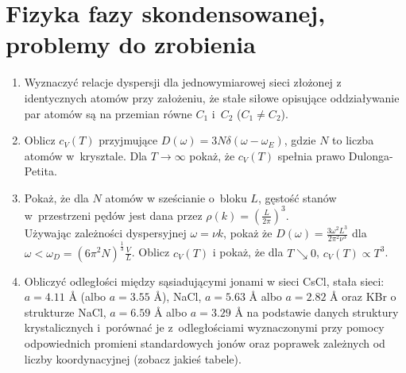 \documentclass[a4paper,11pt]{article}
\begin{document}










\section{Fizyka fazy skondensowanej, problemy do zrobienia}





\begin{enumerate}

\item Wyznaczyć relacje dyspersji dla jednowymiarowej sieci złożonej z
  identycznych atomów przy założeniu, że stałe siłowe opisujące
  oddziaływanie par atomów są na przemian równe $C_{ 1 }$ i~$C_{ 2 }$
  ($C_{ 1 } \neq C_{ 2 }$).

\item Oblicz $c_{ V }( T )$ przyjmujące
  $D( \omega ) = 3 N \delta( \omega - \omega_{ E } )$, gdzie $N$ to
  liczba atomów w~krysztale. Dla $T \to \infty$ pokaż, że
  $c_{ V }( T )$ spełnia prawo Dulonga-Petita.



\item Pokaż, że dla $N$ atomów w sześcianie o~bloku $L$, gęstość stanów
  w~przestrzeni pędów jest dana przez
  $\rho( k ) = \left( \frac{ L }{ 2\pi } \right)^{ 3 }$. \\
  Używając zależności dyspersyjnej $\omega = \nu k$, pokaż że
  $D( \omega ) = \frac{ 3 \omega^{ 2 } L^{ 3 } }{ 2\pi^{ 2 } \nu^{ 3 }
  }$ dla
  $\omega < \omega_{ D } = ( 6 \pi^{ 2 } N )^{ \frac{ 1 }{ 3 } }
  \frac{ V }{ L }$. Oblicz $c_{ V }( T )$ i pokaż, że dla
  $T \searrow 0$, $c_{ V }( T ) \propto T^{ 3 }$.



\item Obliczyć odległości między sąsiadującymi jonami w sieci CsCl,
  stała sieci: $a = 4.11$ \AA{} (albo $a = 3.55$ \AA), NaCl,
  $a = 5.63$ \AA{} albo $a = 2.82$ \AA{} oraz KBr o strukturze NaCl,
  $a = 6.59$ \AA{} albo $a = 3.29$ \AA{} na podstawie danych struktury
  krystalicznych i~porównać je z~odległościami wyznaczonymi przy
  pomocy odpowiednich promieni standardowych jonów oraz poprawek
  zależnych od liczby koordynacyjnej (zobacz jakieś tabele).


\end{enumerate}
\end{document}
